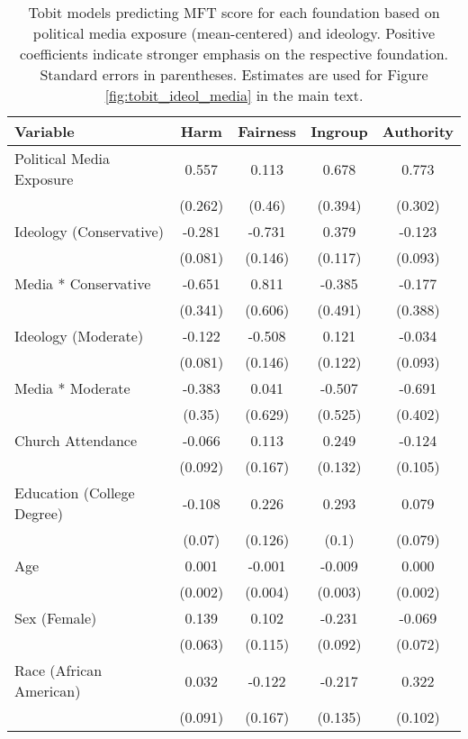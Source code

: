\begin{table}[ht]
\centering
\caption{Tobit models predicting MFT score for each foundation based 
           on political media exposure (mean-centered) and ideology. Positive coefficients indicate 
           stronger emphasis on the respective foundation. Standard errors in parentheses. Estimates 
           are used for Figure \ref{fig:tobit_ideol_media} in the main text.} 
\label{tab:tobit_ideol_media}
\begingroup\footnotesize
\begin{tabular}{lcccc}
  \hline
Variable & Harm & Fairness & Ingroup & Authority \\ 
  \hline
Political Media Exposure &  0.557 &  0.113 &  0.678 &  0.773 \\ 
   & (0.262) & (0.46) & (0.394) & (0.302) \\ 
  Ideology (Conservative) & -0.281 & -0.731 &  0.379 & -0.123 \\ 
   & (0.081) & (0.146) & (0.117) & (0.093) \\ 
  Media * Conservative & -0.651 &  0.811 & -0.385 & -0.177 \\ 
   & (0.341) & (0.606) & (0.491) & (0.388) \\ 
  Ideology (Moderate) & -0.122 & -0.508 &  0.121 & -0.034 \\ 
   & (0.081) & (0.146) & (0.122) & (0.093) \\ 
  Media * Moderate & -0.383 &  0.041 & -0.507 & -0.691 \\ 
   & (0.35) & (0.629) & (0.525) & (0.402) \\ 
  Church Attendance & -0.066 &  0.113 &  0.249 & -0.124 \\ 
   & (0.092) & (0.167) & (0.132) & (0.105) \\ 
  Education (College Degree) & -0.108 &  0.226 &  0.293 &  0.079 \\ 
   & (0.07) & (0.126) & (0.1) & (0.079) \\ 
  Age &  0.001 & -0.001 & -0.009 &  0.000 \\ 
   & (0.002) & (0.004) & (0.003) & (0.002) \\ 
  Sex (Female) &  0.139 &  0.102 & -0.231 & -0.069 \\ 
   & (0.063) & (0.115) & (0.092) & (0.072) \\ 
  Race (African American) &  0.032 & -0.122 & -0.217 &  0.322 \\ 
   & (0.091) & (0.167) & (0.135) & (0.102) \\ 

\end{tabular}
\end{table}
